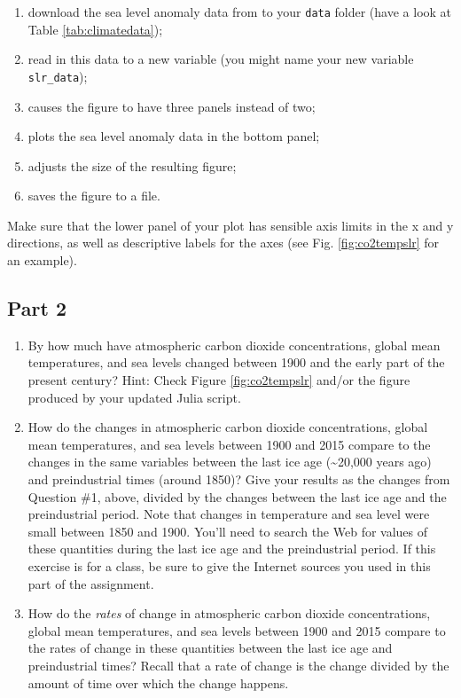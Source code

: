 \documentclass[
  11pt,
]{book}
\providecommand{\tightlist}{%
  \setlength{\itemsep}{0pt}\setlength{\parskip}{0pt}}
\begin{document}
\begin{enumerate}
\def\labelenumi{\arabic{enumi}.}
\tightlist
\item
  download the sea level anomaly data from \citet{Jevrejeva2014-my} to your \texttt{data} folder (have a look at Table \ref{tab:climatedata});
\item
  read in this data to a new variable (you might name your new variable \texttt{slr\_data});
\item
  causes the figure to have three panels instead of two;
\item
  plots the sea level anomaly data in the bottom panel;
\item
  adjusts the size of the resulting figure;
\item
  saves the figure to a file.
\end{enumerate}

Make sure that the lower panel of your plot has sensible axis limits in the x and y directions, as well as descriptive labels for the axes (see Fig. \ref{fig:co2tempslr} for an example).

\hypertarget{part-2}{%
\subsection*{Part 2}\label{part-2}}


\begin{enumerate}
\def\labelenumi{\arabic{enumi}.}
\tightlist
\item
  By how much have atmospheric carbon dioxide concentrations, global mean temperatures, and sea levels changed between 1900 and the early part of the present century? Hint: Check Figure \ref{fig:co2tempslr} and/or the figure produced by your updated Julia script.
\item
  How do the changes in atmospheric carbon dioxide concentrations, global mean temperatures, and sea levels between 1900 and 2015 compare to the changes in the same variables between the last ice age (\textasciitilde20,000 years ago) and preindustrial times (around 1850)? Give your results as the changes from Question \#1, above, divided by the changes between the last ice age and the preindustrial period. Note that changes in temperature and sea level were small between 1850 and 1900. You'll need to search the Web for values of these quantities during the last ice age and the preindustrial period. If this exercise is for a class, be sure to give the Internet sources you used in this part of the assignment.
\item
  How do the \emph{rates} of change in atmospheric carbon dioxide concentrations, global mean temperatures, and sea levels between 1900 and 2015 compare to the rates of change in these quantities between the last ice age and preindustrial times? Recall that a rate of change is the change divided by the amount of time over which the change happens.
\end{enumerate}
\end{document}
